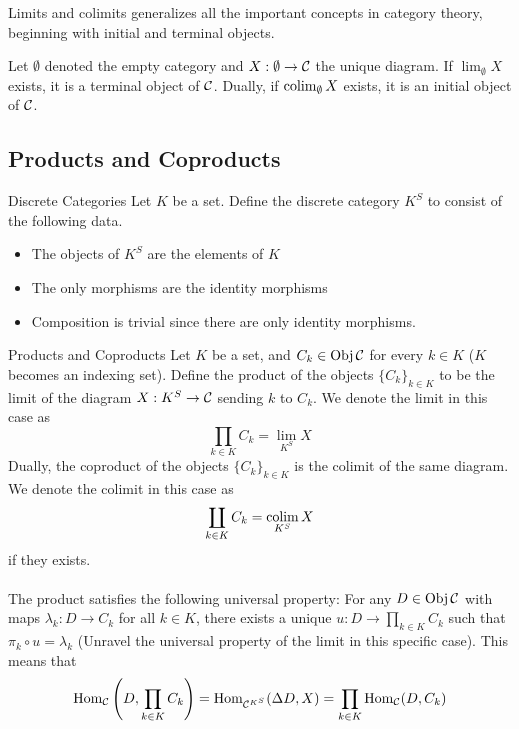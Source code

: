 \documentclass[a4paper]{article}
\begin{document}
Limits and colimits generalizes all the important concepts in category theory, beginning with initial and terminal objects. 

\begin{prp}{}{} Let $\emptyset$ denoted the empty category and $X:\emptyset\to\mathcal{C}$ the unique diagram. If $\lim_\emptyset X$ exists, it is a terminal object of $\mathcal{C}$. Dually, if $\operatorname*{colim}_\emptyset X$ exists, it is an initial object of $\mathcal{C}$. 
\end{prp}

\subsection{Products and Coproducts}
\begin{defn}{Discrete Categories}{} Let $K$ be a set. Define the discrete category $K^S$ to consist of the following data. 
\begin{itemize}
\item The objects of $K^S$ are the elements of $K$
\item The only morphisms are the identity morphisms
\item Composition is trivial since there are only identity morphisms. 
\end{itemize}
\end{defn}

\begin{defn}{Products and Coproducts}{} Let $K$ be a set, and $C_k\in\operatorname{Obj}\mathcal{C}$ for every $k\in K$ ($K$ becomes an indexing set). Define the product of the objects $\{C_k\}_{k\in K}$ to be the limit of the diagram $X:K^S\to\mathcal{C}$ sending $k$ to $C_k$. We denote the limit in this case as $$\prod_{k\in K}C_k=\lim_{K^S}X$$ Dually, the coproduct of the objects $\{C_k\}_{k\in K}$ is the colimit of the same diagram. We denote the colimit in this case as $$\coprod_{k\in K}C_k=\operatorname*{colim}_{K^S}X$$ if they exists. \\~\\
The product satisfies the following universal property: For any $D\in\operatorname{Obj}\mathcal{C}$ with maps $\lambda_k:D\to C_k$ for all $k\in K$, there exists a unique $u:D\to\prod_{k\in K}C_k$ such that $\pi_k\circ u=\lambda_k$ (Unravel the universal property of the limit in this specific case). This means that $$\operatorname{Hom}_{\mathcal{C}}\left(D,\prod_{k\in K}C_k\right)=\operatorname{Hom}_{\mathcal{C}^{K^S}}(\Delta D,X)=\prod_{k\in K}\operatorname{Hom}_{\mathcal{C}}(D, C_k)$$
\end{defn}
\end{document}
